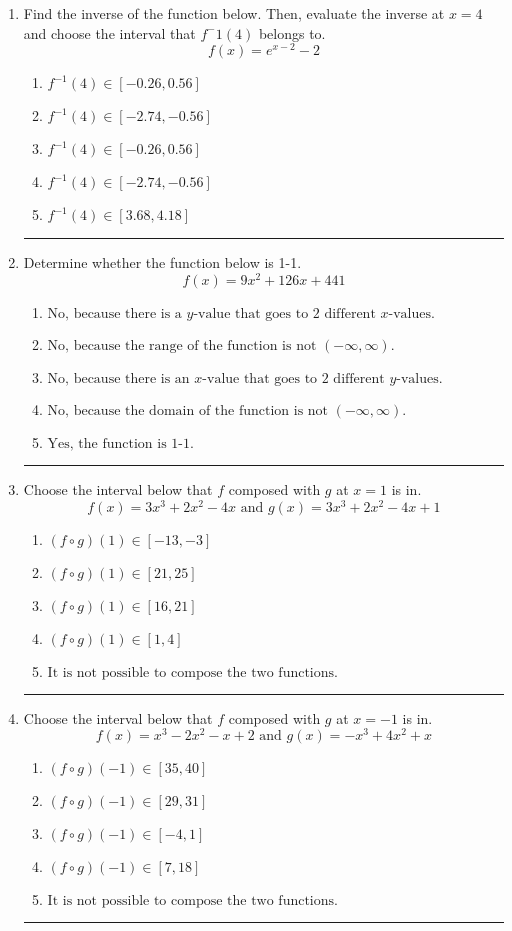 \documentclass[14pt]{extbook}
\newcommand{\litem}[1]{\item#1\hspace*{-1cm}\rule{\textwidth}{0.4pt}}
\begin{document}
\begin{enumerate}
{\begin{enumerate}[label=\Alph*.]
\end{enumerate} }
\litem{
Find the inverse of the function below. Then, evaluate the inverse at $x = 4$ and choose the interval that $f^-1(4)$ belongs to.\[ f(x) = e^{x-2}-2 \]\begin{enumerate}[label=\Alph*.]
\item \( f^{-1}(4) \in [-0.26, 0.56] \)
\item \( f^{-1}(4) \in [-2.74, -0.56] \)
\item \( f^{-1}(4) \in [-0.26, 0.56] \)
\item \( f^{-1}(4) \in [-2.74, -0.56] \)
\item \( f^{-1}(4) \in [3.68, 4.18] \)

\end{enumerate} }
\litem{
Determine whether the function below is 1-1.\[ f(x) = 9 x^2 + 126 x + 441 \]\begin{enumerate}[label=\Alph*.]
\item \( \text{No, because there is a $y$-value that goes to 2 different $x$-values.} \)
\item \( \text{No, because the range of the function is not $(-\infty, \infty)$.} \)
\item \( \text{No, because there is an $x$-value that goes to 2 different $y$-values.} \)
\item \( \text{No, because the domain of the function is not $(-\infty, \infty)$.} \)
\item \( \text{Yes, the function is 1-1.} \)

\end{enumerate} }
\litem{
Choose the interval below that $f$ composed with $g$ at $x=1$ is in.\[ f(x) = 3x^{3} +2 x^{2} -4 x \text{ and } g(x) = 3x^{3} +2 x^{2} -4 x + 1 \]\begin{enumerate}[label=\Alph*.]
\item \( (f \circ g)(1) \in [-13, -3] \)
\item \( (f \circ g)(1) \in [21, 25] \)
\item \( (f \circ g)(1) \in [16, 21] \)
\item \( (f \circ g)(1) \in [1, 4] \)
\item \( \text{It is not possible to compose the two functions.} \)

\end{enumerate} }
\litem{
Choose the interval below that $f$ composed with $g$ at $x=-1$ is in.\[ f(x) = x^{3} -2 x^{2} -x + 2 \text{ and } g(x) = -x^{3} +4 x^{2} +x \]\begin{enumerate}[label=\Alph*.]
\item \( (f \circ g)(-1) \in [35, 40] \)
\item \( (f \circ g)(-1) \in [29, 31] \)
\item \( (f \circ g)(-1) \in [-4, 1] \)
\item \( (f \circ g)(-1) \in [7, 18] \)
\item \( \text{It is not possible to compose the two functions.} \)


\end{enumerate}}
\end{enumerate}
\end{document}
